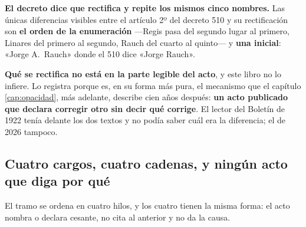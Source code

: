 \begin{cautela}
\textbf{El decreto dice que rectifica y repite los mismos cinco nombres.} Las únicas diferencias
visibles entre el artículo 2º del decreto 510 y su rectificación son \textbf{el orden de la
enumeración} ---Regis pasa del segundo lugar al primero, Linares del primero al segundo, Rauch del
cuarto al quinto--- y \textbf{una inicial}: «Jorge A.\ Rauch» donde el 510 dice «Jorge Rauch».

\textbf{Qué se rectifica no está en la parte legible del acto}, y este libro no lo infiere. Lo
registra porque es, en su forma más pura, el mecanismo que el capítulo \ref{cap:opacidad}, más adelante,
describe cien años después: \textbf{un acto publicado que declara corregir otro sin decir qué
corrige}. El lector del Boletín de 1922 tenía delante los dos textos y no podía saber cuál era la
diferencia; el de 2026 tampoco.
\end{cautela}

\subsection*{Cuatro cargos, cuatro cadenas, y ningún acto que diga por qué}

El tramo se ordena en cuatro hilos, y los cuatro tienen la misma forma: el acto nombra o
declara cesante, no cita al anterior y no da la causa.


